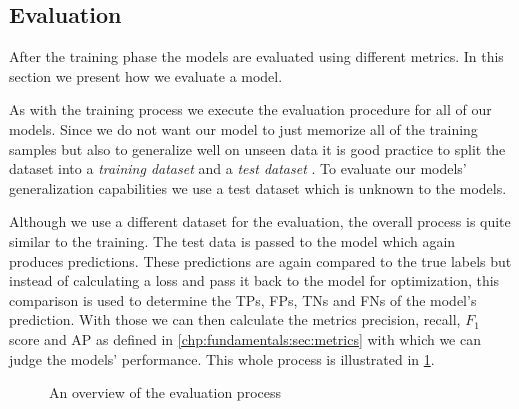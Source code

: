 \subsection{Evaluation}
\label{chp:study:sec:design:subsec:evaluation}
After the training phase the models are evaluated using different metrics.
In this section we present how we evaluate a model.

As with the training process we execute the evaluation procedure for all of our models.
Since we do not want our model to just memorize all of the training samples but also to generalize well on unseen data it is good practice to split the dataset into a \textit{training dataset} and a \textit{test dataset} \parencite{Reitermanova:2010}.
To evaluate our models' generalization capabilities we use a test dataset which is unknown to the models.

Although we use a different dataset for the evaluation, the overall process is quite similar to the training.
The test data is passed to the model which again produces predictions.
These predictions are again compared to the true labels but instead of calculating a loss and pass it back to the model for optimization, this comparison is used to determine the \acp{TP}, \acp{FP}, \acp{TN} and \acp{FN} of the model's prediction.
With those we can then calculate the metrics precision, recall, $F_1$ score and \ac{AP} as defined in \cref{chp:fundamentals:sec:metrics} with which we can judge the models' performance.
This whole process is illustrated in \cref{fig:study:design:evaluation}.

\newpage
\begin{figure}[htpb]
    \centering
    \def\svgwidth{\columnwidth}
    
    \caption[Study Design: Evaluation]{An overview of the evaluation process}\label{fig:study:design:evaluation}
\end{figure}
